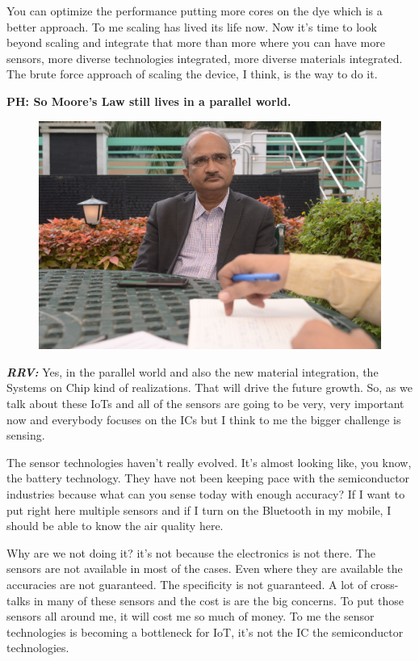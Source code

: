 \begin{multicols}{2}
You can optimize the performance putting more cores on the dye which is a better approach. To me scaling has lived its life now. Now it’s time to look beyond scaling and integrate that more than more where you can have more sensors, more diverse technologies integrated, more diverse materials integrated. The brute force approach of scaling the device, I think, is the way to do it.

\textbf{PH: So Moore’s Law still lives in a parallel world.} 

\begin{figure}[H]
\centering
\includegraphics[scale=.59]{src/Figures/interview/interview-fig12.jpg}
\end{figure}

\textbf{\textit{RRV:}} Yes, in the parallel world and also the new material integration, the Systems on Chip kind of realizations. That will drive the future growth. So, as we talk about these IoTs and all of the sensors are going to be very, very important now and everybody focuses on the ICs but I think to me the bigger challenge is sensing.

The sensor technologies haven’t really evolved. It’s almost looking like, you know, the battery technology. They have not been keeping pace with the semiconductor industries because what can you sense today with enough accuracy? If I want to put right here multiple sensors and if I turn on the Bluetooth in my mobile, I should be able to know the air quality here.

Why are we not doing it? it’s not because the electronics is not there. The sensors are not available in most of the cases. Even where they are available the accuracies are not guaranteed. The specificity is not guaranteed. A lot of cross-talks in many of these sensors and the cost is are the big concerns. To put those sensors all around me, it will cost me so much of money. To me the sensor technologies is becoming a bottleneck for IoT, it’s not the IC the semiconductor technologies.


\end{multicols}
